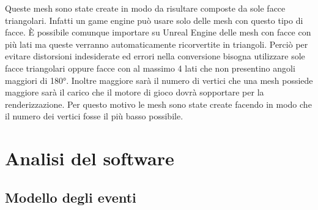     Queste mesh sono state create in modo da risultare composte da sole facce triangolari.
    Infatti un game engine può usare solo delle mesh con questo tipo di facce.
    È possibile comunque importare su Unreal Engine delle mesh con facce con più lati ma queste verranno automaticamente ricorvertite in triangoli.
    Perciò per evitare distorsioni indesiderate ed errori nella conversione bisogna utilizzare sole facce triangolari oppure facce con al massimo 4 lati che non presentino angoli maggiori di 180°.
    Inoltre maggiore sarà il numero di vertici che una mesh possiede maggiore sarà il carico che il motore di gioco dovrà sopportare per la renderizzazione.
    Per questo motivo le mesh sono state create facendo in modo che il numero dei vertici fosse il più basso possibile.

    \section{Analisi del software}

    \subsection{Modello degli eventi}


